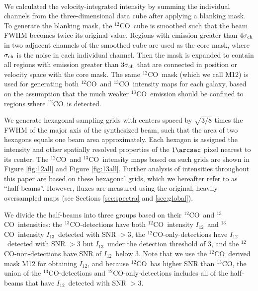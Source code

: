\documentclass{emulateapj}
\def\ttco{\mbox{$^{13}$CO}}
\def\twco{\mbox{$^{12}$CO}}
\def\ttline{ $^{13}\mathrm{CO} (J = 1 \rightarrow 0)$}
\def\itw{$I_{12}$}
\def\itt{$I_{13}$}
\begin{document}
\begin{figure*}
\hspace{0.7cm}
\\
\caption{\ttline \ integrated intensity maps of the 12 galaxies, 
using same masks as in Figure \ref{fig:12all}. 
Contours show SNR of \ttline  \ at the levels of $[3, 6, 9]$.}
\label{fig:13all}
\end{figure*}

We calculated the velocity-integrated intensity by summing the individual channels from 
the three-dimensional data cube after applying a blanking mask. 
To generate the blanking mask, the \twco \ cube is smoothed 
such that the beam FWHM becomes twice its original value.
Regions with emission greater than $4 \sigma_{\rm ch}$ 
in two adjacent channels of the smoothed cube are used as the core
mask, where $\sigma_{\rm ch}$ is the noise in each individual
channel.
Then the mask is expanded to contain all regions with 
emission greater than $3 \sigma_{\rm ch}$ that are connected
in position or velocity space with the core mask. 
The same \twco \ mask (which we call M12) is used for generating 
both \twco \ and \ttco \ intensity maps for each galaxy, 
based on the assumption that the much weaker  \ttco \ emission should 
be confined to regions where \twco \ is detected.

We generate hexagonal sampling grids with centers
spaced by $\sqrt{3/8}$ times 
the FWHM of the major axis of the synthesized beam,
such that the area of two hexagons equals one beam area approximately.  
Each hexagon is assigned the intensity and other spatially resolved properties 
of the $1 \arcsec$ pixel nearest to its center.
The \twco \ and \ttco \ intensity maps based on such grids 
are shown in Figure \ref{fig:12all} and Figure \ref{fig:13all}. 
Further analysis of intensities throughout this paper 
are based on these hexagonal grids, which we hereafter refer to
as ``half-beams''.
However, fluxes are measured using the original, heavily oversampled
maps (see Sections \ref{sec:spectra} and \ref{sec:global}). 

We divide the half-beams into three groups 
based on their \twco \ and \ttco \ intensities: 
the \ttco-detections have both \twco \ intensity \itw \ and 
\ttco \ intensity \itt \ detected with SNR $>3$,  
the \twco-only-detections have
 \itw \ detected with SNR $>3$ but \itt \ under the detection
threshold of 3, and the \twco-non-detections have 
SNR of \itw \ below 3.  
Note that we use the \twco \ derived mask M12 for obtaining \itw, 
and because \twco \ has higher SNR than \ttco, 
the union of the \ttco-detections and  \twco-only-detections includes all 
of the half-beams that have  \itw \ detected with SNR $> 3$.  
\end{document}
